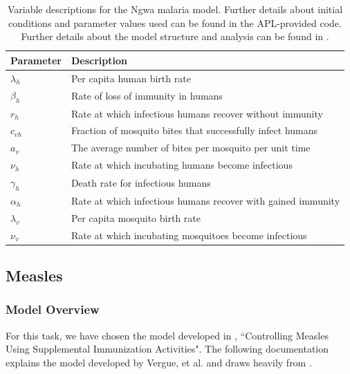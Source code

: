 \documentclass[letter,12pt, usenames,dvipsnames]{article}
\newcommand{\MYhref}[3][Blue]{\href{#2}{\color{#1}{#3}}}
\begin{document}
\begin{table}[h!]
\centering
\begin{tabular}{|l|l|}
\hline
Parameter & Description \\\hline\hline 
$\lambda_h$ & Per capita human birth rate\\\hline
$\beta_h$ & Rate of loss of immunity in humans\\\hline
$r_h$ & Rate at which infectious humans recover without immunity\\\hline
$c_{vh}$ & Fraction of mosquito bites that successfully infect humans\\\hline
$a_{v}$& The average number of bites per mosquito per unit time\\\hline
$\nu_{h}$ & Rate at which incubating humans become infectious\\\hline
$\gamma_{h}$ & Death rate for infectious humans\\\hline
$\alpha_{h}$ & Rate at which infectious humans recover with gained immunity\\\hline
$\lambda_v$ & Per capita mosquito birth rate\\\hline
$\nu_{v}$ & Rate at which incubating mosquitoes become infectious\\\hline
\end{tabular}
\caption{Variable descriptions for the Ngwa malaria model.  Further details about initial conditions and parameter values used can be found in the APL-provided code.  Further details about the model structure and analysis can be found in \cite{malaria}.}
\label{table:MalariaParameters}
\end{table}

\pagebreak
\subsection{Measles} 
\label{sec:Measles}

\subsubsection{Model Overview}
For this task, we have chosen the model developed in 
{\MYhref{https://www.sciencedirect.com/science/article/pii/S0264410X14016077}{Vergue, et al.}}\cite{measles}, ``Controlling Measles Using Supplemental Immunization Activities".  The following documentation explains the model developed by Vergue, et al. and draws heavily from \cite{measles}.
\end{document}
